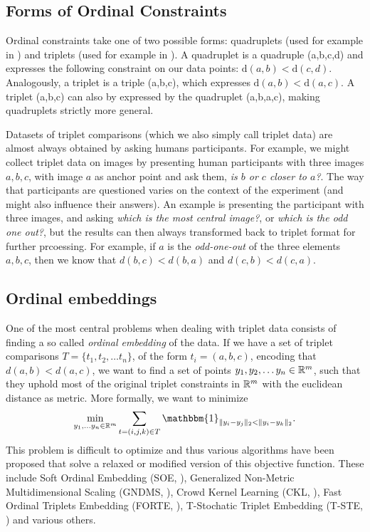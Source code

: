 \subsection{Forms of Ordinal Constraints}
Ordinal constraints take one of two possible forms: quadruplets (used for example in \cite{ghoshdastidarFoundationsComparisonBasedHierarchical2019}) and triplets (used for example in \cite{vankadaraInsightsOrdinalEmbedding2021,haghiriComparisonBasedFrameworkPsychophysics2019}).
A quadruplet is a quadruple (a,b,c,d) 
and expresses the following constraint on our data points: $\text{d}(a,b) < \text{d}(c,d)$. 
Analogously, a triplet is a triple (a,b,c), which expresses $\text{d}(a,b) < \text{d}(a,c)$. 
A triplet (a,b,c) can also by expressed by the quadruplet (a,b,a,c), making quadruplets strictly more general. 

Datasets of triplet comparisons (which we also simply call triplet data) are almost always obtained by asking humans participants. For example, we might 
collect triplet data on images by presenting human participants with three images $a,b,c$, 
with image $a$ as anchor point and ask them, \textit{is $b$ or $c$ closer to $a$?}.
The way that participants are questioned varies on the context of the experiment (and might also influence their answers). An
example is presenting the participant with three images, and asking \textit{which is the most central image?}, or \textit{which is the odd one out?},
but the results can then always transformed back to triplet format for further prcoessing. For example, if $a$ is the \textit{odd-one-out} of the three elements $a,b,c$, 
then we know that $d(b,c) < d(b,a)$ and $d(c, b) < d(c,a)$. 

\subsection{Ordinal embeddings}
One of the most central problems when dealing with triplet data consists of finding a so called \textit{ordinal embedding} of the data. If we have a set of triplet comparisons $T = \{t_1, t_2, \ldots t_n\}$, 
of the form $t_i = \left( a,b,c \right)$, encoding that $d(a,b) < d(a,c)$, 
we want to find a set of points $y_1, y_2, \ldots y_n \in \mathbb{R}^{m}$, such that they uphold most of the original triplet constraints in $\mathbb{R}^{m}$ with the euclidean distance
as metric. More formally, we want to minimize \citep{vankadaraInsightsOrdinalEmbedding2021}
\begin{align*}
    \min_{y_1, \ldots y_n \in \R^{m}} \sum_{t=\left( i,j,k \right)  \in T} \mathbbm{1}_{ \|y_i - y_j\|_2 < \|y_i - y_k\|_2 }
.\end{align*}
This problem is difficult to optimize and thus various algorithms have been proposed that solve a relaxed or modified version of this objective function. 
These include Soft Ordinal Embedding  (SOE, \cite{teradaLocalOrdinalEmbedding2014}), Generalized Non-Metric Multidimensional Scaling (GNDMS, \cite{agarwalGeneralizedNonmetricMultidimensional2007}), 
Crowd Kernel Learning (CKL, \cite{tamuzAdaptivelyLearningCrowd2011}), Fast Ordinal Triplets Embedding (FORTE, \cite{jainFiniteSamplePrediction2016}),
T-Stochatic Triplet Embedding (T-STE, \cite{laurensvandermaatenStochasticTripletEmbedding2012}) and various others. 

